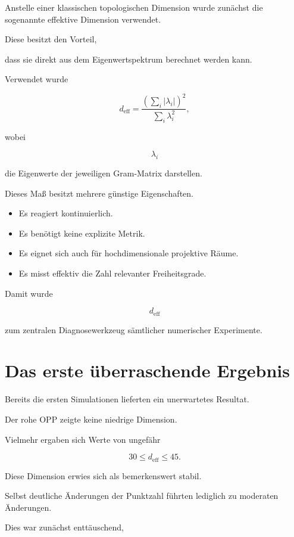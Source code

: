 Anstelle einer klassischen topologischen Dimension wurde zunächst die sogenannte effektive Dimension verwendet.

Diese besitzt den Vorteil,

dass sie direkt aus dem Eigenwertspektrum berechnet werden kann.

Verwendet wurde

\[
d_{\mathrm{eff}}
=
\frac{\left(\sum_i |\lambda_i|\right)^2}
{\sum_i \lambda_i^2},
\]

wobei

\[
\lambda_i
\]

die Eigenwerte der jeweiligen Gram-Matrix darstellen.

Dieses Maß besitzt mehrere günstige Eigenschaften.

\begin{itemize}

\item Es reagiert kontinuierlich.

\item Es benötigt keine explizite Metrik.

\item Es eignet sich auch für hochdimensionale projektive Räume.

\item Es misst effektiv die Zahl relevanter Freiheitsgrade.

\end{itemize}

Damit wurde

\[
d_{\mathrm{eff}}
\]

zum zentralen Diagnosewerkzeug sämtlicher numerischer Experimente.

\section*{Das erste überraschende Ergebnis}

Bereits die ersten Simulationen lieferten ein unerwartetes Resultat.

Der rohe OPP zeigte keine niedrige Dimension.

Vielmehr ergaben sich Werte von ungefähr

\[
30
\le
d_{\mathrm{eff}}
\le
45.
\]

Diese Dimension erwies sich als bemerkenswert stabil.

Selbst deutliche Änderungen der Punktzahl führten lediglich zu moderaten Änderungen.

Dies war zunächst enttäuschend,

